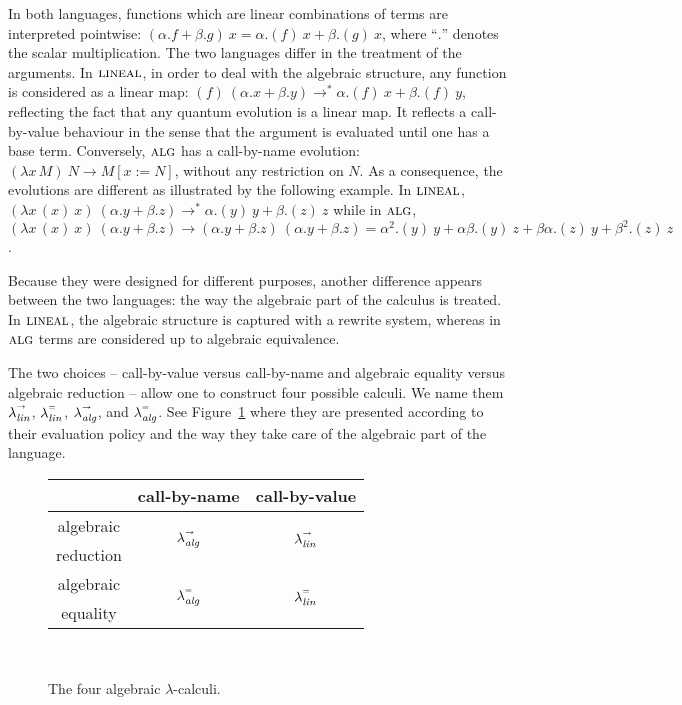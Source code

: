 \documentclass{LMCS}
\newcommand{\olin}{\mbox{\sc lineal}}
\newcommand{\oalg}{\mbox{\sc alg}}
\newcommand{\xllin}[1]{\ensuremath{\lambda^{\raisebox{0.5ex}{\textrm{\tiny $#1$}}}_{{\it lin}}}}
\newcommand{\xlalg}[1]{\ensuremath{\lambda^{\raisebox{0.5ex}{\textrm{\tiny $#1$}}}_{{\it alg}}}}
\newcommand{\llinred}{\xllin{\rightarrow}}
\newcommand{\lalgred}{\xlalg{\rightarrow}}
\newcommand{\llineq}{\xllin{=}}
\newcommand{\lalgeq}{\xlalg{=}}
\begin{document}
In both languages, functions which are linear combinations of terms are interpreted pointwise: $(\alpha. f + \beta. g)~x = \alpha.(f)~x+\beta.(g)~x$, where ``$.$'' denotes the scalar multiplication. The two languages differ in the treatment of the arguments. In $\olin$, 
in order to deal with the algebraic structure, any function is considered as a linear map: $(f)~(\alpha.x + \beta.y) \to^* \alpha.(f)~x+\beta.(f)~y$, reflecting the fact that any quantum evolution is a linear map. It reflects a call-by-value behaviour in the sense that the argument is evaluated until one has a base term.
Conversely, $\oalg$ has a call-by-name evolution: $(\lambda x\, M)~N \to M[x:= N]$, without any restriction on $N$. As a consequence, the evolutions are different as illustrated by the following example. In $\olin$, $(\lambda x\,(x)~x)~(\alpha.y+\beta.z) \to^* \alpha.(y)~y+ \beta.(z)~z$ while in $\oalg$, $(\lambda x\,(x)~x)~(\alpha.y+\beta.z) \to (\alpha.y+\beta.z)~(\alpha.y+\beta.z)= \alpha^2.(y)~y+ \alpha\beta.(y)~z +\beta\alpha.(z)~y+ \beta^2.(z)~z$. 

Because they were designed for different purposes, another difference
appears between the two languages: the way the algebraic part of the
calculus is treated. In $\olin$, the algebraic structure is captured
with a rewrite system, whereas in $\oalg$ terms are considered up to
algebraic equivalence.

The two choices -- call-by-value versus call-by-name and algebraic
equality versus algebraic reduction -- allow one to construct four
possible calculi. We name them \llinred, \llineq, \lalgred, and \lalgeq. See Figure~\ref{tab:linalg} where they
are presented according to their evaluation policy and the
way they take care of the algebraic part of the language.
\begin{figure}[b]
  \def\arraystretch{1.5}
  \begin{tabular}{|c|c|c|}
    \hline
    & call-by-name  &  call-by-value \\
    \hline
    algebraic & \multirow{2}{*}{\lalgred} & \multirow{2}{*}{\llinred}\\[-0.2cm]
    reduction 
    & & \\
    \hline
    algebraic & \multirow{2}{*}{\lalgeq} & \multirow{2}{*}{\llineq}\\[-0.2cm]
    equality & & \\
    \hline
  \end{tabular}\\[1.5ex]
  \caption{The four algebraic $\lambda$-calculi.}
  \label{tab:linalg}
\end{figure}
\end{document}
